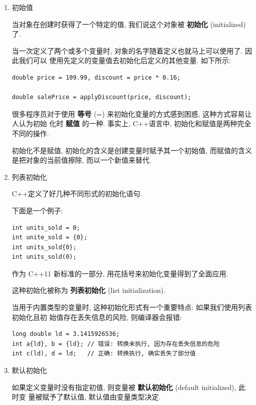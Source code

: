 \documentclass[lang=cn]{elegantbook}
\begin{document}
\begin{enumerate}
\item 初始值
\label{sec:orgd7b6201}

当对象在创建时获得了一个特定的值, 我们说这个对象被 \textbf{初始化} (initialized) 了.

当一次定义了两个或多个变量时, 对象的名字随着定义也就马上可以使用了. 因此我们可以
使用先定义的变量值去初始化后定义的其他变量. 如下所示:

\begin{verbatim}
double price = 109.99, discount = price * 0.16;

double salePrice = applyDiscount(price, discount);
\end{verbatim}

很多程序员对于使用 \textbf{等号} (=) 来初始化变量的方式感到困惑, 这种方式容易让人认为初始
化时 \textbf{赋值} 的一种. 事实上, C++语言中, 初始化和赋值是两种完全不同的操作.

\vspace*{1\baselineskip}
\begin{note}
初始化不是赋值, 初始化的含义是创建变量时赋予其一个初始值, 而赋值的含义是把对象的当前值擦除, 而以一个新值来替代.
\end{note}

\item 列表初始化
\label{sec:org6033b84}

C++定义了好几种不同形式的初始化语句.

下面是一个例子:

\begin{verbatim}
int units_sold = 0;
int unite_sold = {0};
int units_sold{0};
int units_sold(0);
\end{verbatim}

作为 C++11 新标准的一部分, 用花括号来初始化变量得到了全面应用.

这种初始化被称为 \textbf{列表初始化} (list initialization).

当用于内置类型的变量时, 这种初始化形式有一个重要特点: 如果我们使用列表初始化且初
始值存在丢失信息的风险, 则编译器会报错:

\begin{verbatim}
long double ld = 3.1415926536;
int a{ld}, b = {ld}; // 错误: 转换未执行, 因为存在丢失信息的危险
int c(ld), d = ld;   // 正确: 转换执行, 确实丢失了部分值
\end{verbatim}

\item 默认初始化
\label{sec:orgacafbfa}

如果定义变量时没有指定初值, 则变量被 \textbf{默认初始化} (default initialized), 此时变
量被赋予了默认值, 默认值由变量类型决定.


\end{enumerate}
\end{document}
